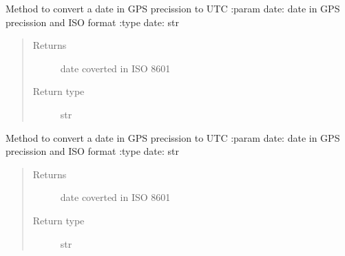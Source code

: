 
\begin{fulllineitems}
\label{\detokenize{s2boa.ingestions:s2boa.ingestions.functions.convert_from_datetime_gps_to_datetime_utc}}
\sphinxAtStartPar
Method to convert a date in GPS precission to UTC
:param date: date in GPS precission and ISO format
:type date: str
\begin{quote}\begin{description}
\item[{Returns}] \leavevmode
\sphinxAtStartPar
date coverted in ISO 8601

\item[{Return type}] \leavevmode
\sphinxAtStartPar
str

\end{description}\end{quote}

\end{fulllineitems}


\begin{fulllineitems}
\label{\detokenize{s2boa.ingestions:s2boa.ingestions.functions.convert_from_gps_to_utc}}
\sphinxAtStartPar
Method to convert a date in GPS precission to UTC
:param date: date in GPS precission and ISO format
:type date: str
\begin{quote}\begin{description}
\item[{Returns}] \leavevmode
\sphinxAtStartPar
date coverted in ISO 8601

\item[{Return type}] \leavevmode
\sphinxAtStartPar
str

\end{description}\end{quote}

\end{fulllineitems}

